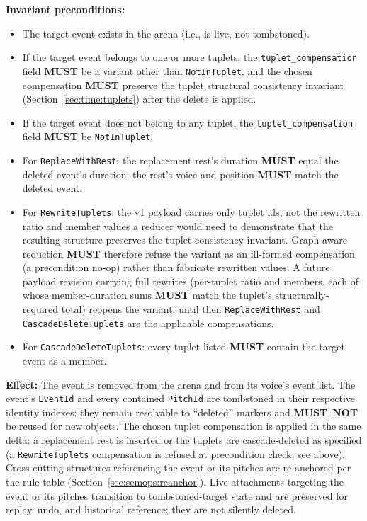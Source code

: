 \documentclass[11pt,letterpaper]{report}
\newcommand{\MUST}{\textbf{MUST}}
\newcommand{\MUSTNOT}{\textbf{MUST}\nobreak\ \textbf{NOT}}
\begin{document}
\textbf{Invariant preconditions:}
\begin{itemize}
  \item The target event exists in the arena (i.e., is live, not
    tombstoned).
  \item If the target event belongs to one or more tuplets, the
    \texttt{tuplet\_compensation} field \MUST{} be a variant other
    than \texttt{NotInTuplet}, and the chosen compensation \MUST{}
    preserve the tuplet structural consistency invariant
    (Section~\ref{sec:time:tuplets}) after the delete is applied.
  \item If the target event does not belong to any tuplet, the
    \texttt{tuplet\_compensation} field \MUST{} be
    \texttt{NotInTuplet}.
  \item For \texttt{ReplaceWithRest}: the replacement rest's
    duration \MUST{} equal the deleted event's duration; the rest's
    voice and position \MUST{} match the deleted event.
  \item For \texttt{RewriteTuplets}: the v1 payload carries only
    tuplet ids, not the rewritten ratio and member values a reducer
    would need to demonstrate that the resulting structure preserves
    the tuplet consistency invariant. Graph-aware reduction \MUST{}
    therefore refuse the variant as an ill-formed compensation (a
    precondition no-op) rather than fabricate rewritten values. A
    future payload revision carrying full rewrites (per-tuplet ratio
    and members, each of whose member-duration sums \MUST{} match
    the tuplet's structurally-required total) reopens the variant;
    until then \texttt{ReplaceWithRest} and
    \texttt{CascadeDeleteTuplets} are the applicable compensations.
  \item For \texttt{CascadeDeleteTuplets}: every tuplet listed
    \MUST{} contain the target event as a member.
\end{itemize}

\textbf{Effect:} The event is removed from the arena and from its
voice's event list. The event's \texttt{EventId} and every contained
\texttt{PitchId} are tombstoned in their respective identity
indexes: they remain resolvable to ``deleted'' markers and \MUSTNOT{}
be reused for new objects. The chosen tuplet compensation is applied
in the same delta: a replacement rest is inserted or the tuplets are
cascade-deleted as specified (a \texttt{RewriteTuplets} compensation
is refused at precondition check; see above).
Cross-cutting structures referencing the event or its pitches are
re-anchored per the rule table (Section~\ref{sec:semops:reanchor}).
Live attachments targeting the event or its pitches transition to
tombstoned-target state and are preserved for replay, undo, and
historical reference; they are not silently deleted.
\end{document}
